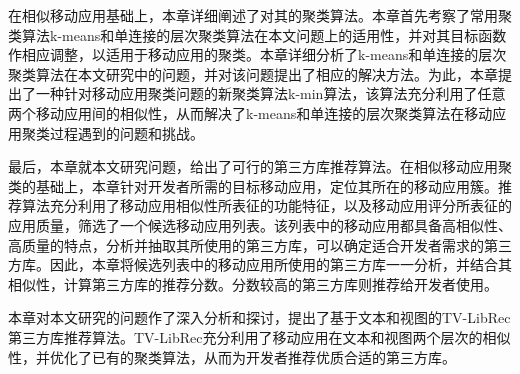 在相似移动应用基础上，本章详细阐述了对其的聚类算法。本章首先考察了常用聚类算法k-means和单连接的层次聚类算法在本文问题上的适用性，并对其目标函数作相应调整，以适用于移动应用的聚类。本章详细分析了k-means和单连接的层次聚类算法在本文研究中的问题，并对该问题提出了相应的解决方法。为此，本章提出了一种针对移动应用聚类问题的新聚类算法k-min算法，该算法充分利用了任意两个移动应用间的相似性，从而解决了k-means和单连接的层次聚类算法在移动应用聚类过程遇到的问题和挑战。

最后，本章就本文研究问题，给出了可行的第三方库推荐算法。在相似移动应用聚类的基础上，本章针对开发者所需的目标移动应用，定位其所在的移动应用簇。推荐算法充分利用了移动应用相似性所表征的功能特征，以及移动应用评分所表征的应用质量，筛选了一个候选移动应用列表。该列表中的移动应用都具备高相似性、高质量的特点，分析并抽取其所使用的第三方库，可以确定适合开发者需求的第三方库。因此，本章将候选列表中的移动应用所使用的第三方库一一分析，并结合其相似性，计算第三方库的推荐分数。分数较高的第三方库则推荐给开发者使用。

本章对本文研究的问题作了深入分析和探讨，提出了基于文本和视图的TV-LibRec第三方库推荐算法。TV-LibRec充分利用了移动应用在文本和视图两个层次的相似性，并优化了已有的聚类算法，从而为开发者推荐优质合适的第三方库。